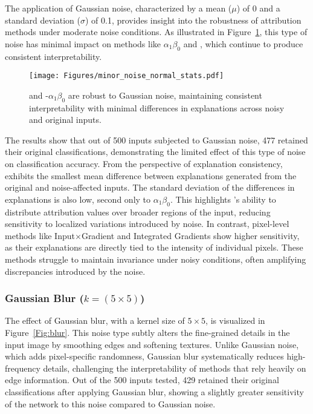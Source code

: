 The application of Gaussian noise, characterized by a mean ($\mu$) of 0 and a standard deviation ($\sigma$) of 0.1, provides insight into the robustness of attribution methods under moderate noise conditions. As illustrated in Figure~\ref{Fig:norm}, this type of noise has minimal impact on methods like \LRP\-$\alpha_1\beta_0$ and \CTC\/, which continue to produce consistent interpretability. 
\begin{figure}[ht!]
	\begin{center}
		\texttt{[image: Figures/minor\_noise\_normal\_stats.pdf]}
	\end{center}
	\caption{\CTC\/ and \LRP-$\alpha_1\beta_0$ are robust to Gaussian noise, maintaining consistent interpretability with minimal differences in explanations across noisy and original inputs.}
	\label{Fig:norm}
\end{figure} 

The results show that out of 500 inputs subjected to Gaussian noise, 477 retained their original classifications, demonstrating the limited effect of this type of noise on classification accuracy. From the perspective of explanation consistency, \CTC\/ exhibits the smallest mean difference between explanations generated from the original and noise-affected inputs. The standard deviation of the differences in \CTC\/ explanations is also low, second only to \LRP\-$\alpha_1\beta_0$. This highlights \CTC\/'s ability to distribute attribution values over broader regions of the input, reducing sensitivity to localized variations introduced by noise. In contrast, pixel-level methods like Input$\times$Gradient and Integrated Gradients show higher sensitivity, as their explanations are directly tied to the intensity of individual pixels. These methods struggle to maintain invariance under noisy conditions, often amplifying discrepancies introduced by the noise.

\subsubsection{Gaussian Blur ($k = (5 \times 5)$)}

The effect of Gaussian blur, with a kernel size of $5 \times 5$, is visualized in Figure~\ref{Fig:blur}. This noise type subtly alters the fine-grained details in the input image by smoothing edges and softening textures. Unlike Gaussian noise, which adds pixel-specific randomness, Gaussian blur systematically reduces high-frequency details, challenging the interpretability of methods that rely heavily on edge information. Out of the 500 inputs tested, 429 retained their original classifications after applying Gaussian blur, showing a slightly greater sensitivity of the network to this noise compared to Gaussian noise.


